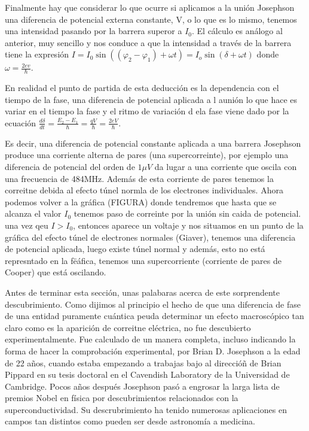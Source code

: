 Finalmente hay que considerar lo que ocurre si aplicamos a la unión Josephson una diferencia de potencial externa constante, V, o lo que es lo mismo, tenemos una intensidad pasando por la barrera superor a $I_0$. El cálculo es análogo al anterior, muy sencillo y nos conduce a que la intensidad a través de la barrera tiene la expresión $I = I_0 \sin( (\varphi_2 - \varphi_1) + \omega t) = I_o \sin(\delta + \omega t)$ donde $\omega = \frac{2 ev}{\hbar}$.

En realidad el punto de partida de esta deducción es la dependencia con el tiempo de la fase, una diferencia de potencial aplicada a l aunión lo que hace es variar en el tiempo la fase y el ritmo de variación d ela fase viene dado por la ecuación $\frac{d \delta}{d t} = \frac{E_2 - E_1}{\hbar} = \frac{qV}{\hbar} = \frac{2 eV}{\hbar}$.

Es decir, una diferencia de potencial constante aplicada a una barrera Josephson produce una corriente alterna de pares (una supercorreinte), por ejemplo una diferencia de potencial del orden de $1 \mu V$ da lugar a una corriente que oscila con una frecuencia de 484MHz. Además de esta corriente de pares tenemos la correitne debida al efecto túnel normla de los electrones individuales. Ahora podemos volver a la gráfica (FIGURA) donde tendremos que hasta que se alcanza el valor $I_0$ tenemos paso de correinte por la unión sin caida de potencial. una vez qeu $I > I_0$, entonces aparece un voltaje y nos situamos en un punto de la gráfica del efecto túnel de electrones normales (Giaver), tenemos una diferencia de potencial aplicada, luego existe túnel normal y además, esto no está represntado en la fëáfica, tenemos una supercorriente (corriente de pares de Cooper) que está oscilando.

Antes de terminar esta sección, unas palabaras acerca de este sorprendente descubrimiento. Como dijimos al principio el hecho de que una diferencia de fase de una entidad puramente cuántica peuda determinar un efecto macroscópico tan claro como es la aparición de correitne eléctrica, no fue descubierto experimentalmente. Fue calculado de un manera completa, incluso indicando la forma de hacer la comprobación experimental, por Brian D. Josephson a la edad de 22 años, cuando estaba empezando a trabajas bajo al direccióñ de Brian Pippard en su tesis doctoral en el Cavendish Laboratory de la Universidad de Cambridge. Pocos años después Josephson pasó a engrosar la larga lista de premios Nobel en física por descubrimientos relacionados con la superconductividad. Su descrubrimiento ha tenido numerosas aplicaciones en campos tan distintos como pueden ser desde astronomía a medicina.

